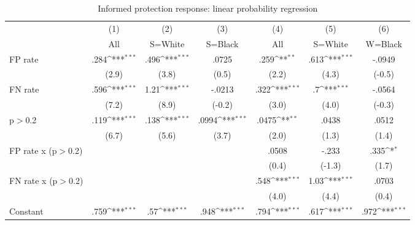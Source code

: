 \begin{table}[htbp]\centering
\def\sym#1{\ifmmode^{#1}\else\(^{#1}\)\fi}
\caption{Informed protection response: linear probability regression}
\begin{tabular}{l*{6}{c}}
\hline\hline
                &\multicolumn{1}{c}{(1)}&\multicolumn{1}{c}{(2)}&\multicolumn{1}{c}{(3)}&\multicolumn{1}{c}{(4)}&\multicolumn{1}{c}{(5)}&\multicolumn{1}{c}{(6)}\\
                &\multicolumn{1}{c}{All}&\multicolumn{1}{c}{S=White}&\multicolumn{1}{c}{S=Black}&\multicolumn{1}{c}{All}&\multicolumn{1}{c}{S=White}&\multicolumn{1}{c}{W=Black}\\
\hline
FP rate         &     .284\sym{***}&     .496\sym{***}&    .0725         &     .259\sym{**} &     .613\sym{***}&   -.0949         \\
                &    (2.9)         &    (3.8)         &    (0.5)         &    (2.2)         &    (4.3)         &   (-0.5)         \\
FN rate         &     .596\sym{***}&     1.21\sym{***}&   -.0213         &     .322\sym{***}&       .7\sym{***}&   -.0564         \\
                &    (7.2)         &    (8.9)         &   (-0.2)         &    (3.0)         &    (4.0)         &   (-0.3)         \\
p$>$0.2         &     .119\sym{***}&     .138\sym{***}&    .0994\sym{***}&    .0475\sym{**} &    .0438         &    .0512         \\
                &    (6.7)         &    (5.6)         &    (3.7)         &    (2.0)         &    (1.3)         &    (1.4)         \\
FP rate x (p$>$0.2)&                  &                  &                  &    .0508         &    -.233         &     .335\sym{*}  \\
                &                  &                  &                  &    (0.4)         &   (-1.3)         &    (1.7)         \\
FN rate x (p$>$0.2)&                  &                  &                  &     .548\sym{***}&     1.03\sym{***}&    .0703         \\
                &                  &                  &                  &    (4.0)         &    (4.4)         &    (0.4)         \\
Constant        &     .759\sym{***}&      .57\sym{***}&     .948\sym{***}&     .794\sym{***}&     .617\sym{***}&     .972\sym{***}\\

\end{tabular}
\end{table}
